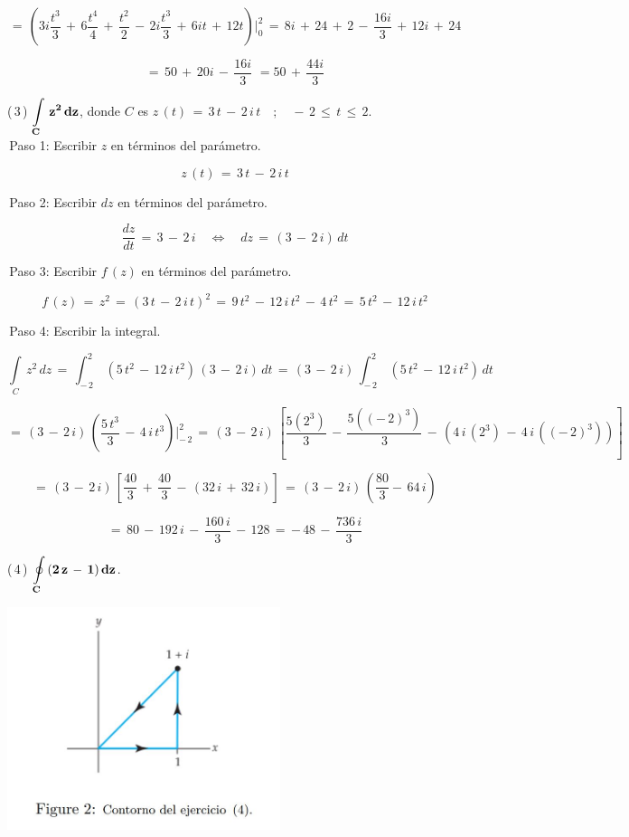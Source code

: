 \documentclass[a4paper,11pt,openany]{book}
\begin{document}
$$=\,\left(  3i\dfrac{t^{3}}{3}\,+\,6\dfrac{t^{4}}{4}\,+\,\dfrac{t^{2}}{2}\,-\,2i\dfrac{t^{3}}{3}\,+\,6it\,+\,12t\right)\bigg|_{0}^{2}\,=\,8i\,+\,24\,+\,2\,-\,\dfrac{16i}{3}\,+\,12i\,+\,24$$

$$=\,50\,+\,20i\,-\,\dfrac{16i}{3}\,\,=\boxed{50\,+\,\dfrac{44i}{3}} $$

\textcolor{ao(english)}{(\,3\,)} $\bf{\displaystyle\int\limits_{C}\,z^{2}\,dz}$, \qquad donde \qquad $C$ es $z\,(t)\,=\,3\,t\,-\,2\,i\,t \quad;\quad -\,2\,\leq\,t\,\leq\,2$.\\

\textcolor{ao(english)}{\,Paso 1:} Escribir $z$ en términos del parámetro.

$$z\,(t)\,=\,3\,t\,-\,2\,i\,t$$

\textcolor{ao(english)}{\,Paso 2:} Escribir $dz$ en términos del parámetro.

$$\dfrac{dz}{dt}\,=\,3\,-\,2\,i \quad\iff\quad dz\,=\,(3\,-\,2\,i)\,dt$$

\textcolor{ao(english)}{\,Paso 3:} Escribir $f\,(z)$ en términos del parámetro.

$$f\,(z)\,=\,z^{2}\,=\,(3\,t\,-\,2\,i\,t)^{2}\,=\,9\,t^{2}\,-\,12\,i\,t^{2}\,-\,4\,t^{2}\,=\,5\,t^{2}\,-\,12\,i\,t^{2}$$

\textcolor{ao(english)}{\,Paso 4:} Escribir la integral.

$$\displaystyle\int\limits_{C}\,z^{2}\,dz\,=\,\displaystyle\int_{-\,2}^{2}\,(5\,t^{2}\,-\,12\,i\,t^{2})\,(3\,-\,2\,i)\,dt\,=\,(3\,-\,2\,i)\,\displaystyle\int_{-\,2}^{2}\,(5\,t^{2}\,-\,12\,i\,t^{2})\,dt$$

$$=\,(3\,-\,2\,i)\,\left(\dfrac{5\,t^{3}}{3}\,-\,4\,i\,t^{3}\right)\bigg|_{-\,2}^{2}\,=\,(3\,-\,2\,i)\,\left[\dfrac{5(2^{3})}{3}\,-\,\dfrac{5((-\,2)^{3})}{3}\,-\,(4\,i\,(2^{3})\,-\,4\,i\,((-\,2)^{3}))\right]$$

$$=\,(3\,-\,2\,i)\,\left[\dfrac{40}{3}\,+\,\dfrac{40}{3}\,-\,(32\,i\,+\,32\,i)\right]\,=\,(3\,-\,2\,i)\,\left(\dfrac{80}{3}-\,64\,i\right)$$

$$=\,80\,-\,192\,i\,-\,\dfrac{160\,i}{3}\,-\,128\,=\,\boxed{-\,48\,-\,\dfrac{736\,i}{3}}$$

\textcolor{ao(english)}{(\,4\,)} $\bf{\displaystyle\oint\limits_{C}\,(2\,z\,-\,1)\,dz}$.

\begin{center}
     \includegraphics[width=8cm]{figura-2.JPG}
\end{center}
\end{document}
